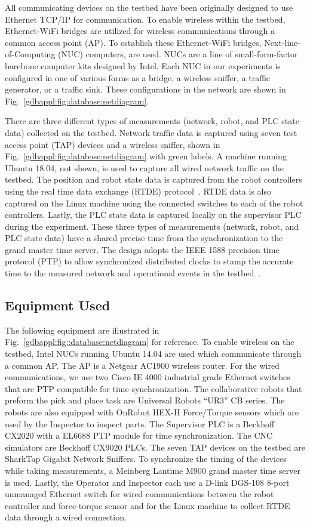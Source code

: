 All communicating devices on the testbed have been originally designed to use Ethernet TCP/IP for communication. To enable wireless within the testbed, Ethernet-WiFi bridges are utilized for wireless communications through a common access point (AP). To establish these Ethernet-WiFi bridges, Next-line-of-Computing (NUC) computers, are used.  NUCs are a line of small-form-factor barebone computer kits designed by Intel.   Each NUC in our experiments is configured in one of various forms as a bridge, a wireless sniffer, a traffic generator, or a traffic sink. These configurations in the network are shown in Fig.~\ref{gdbappl:fig:database:netdiagram}.

There are three different types of measurements (network, robot, and PLC state data) collected on the testbed. Network traffic data is captured using seven test access point (TAP) devices and a wireless sniffer, shown in Fig.~\ref{gdbappl:fig:database:netdiagram} with green labels. A machine running Ubuntu 18.04, not shown, is used to capture all wired network traffic on the testbed. The position and robot state data is captured from the robot controllers using the real time data exchange (RTDE) protocol~\cite{RTDE}. RTDE data is also captured on the Linux machine using the connected switches to each of the robot controllers. Lastly, the PLC state data is captured locally on the supervisor PLC during the experiment. These three types of measurements (network, robot, and PLC state data) have a shared precise time from the synchronization to the grand master time server. The design adopts the IEEE 1588 precision time protocol (PTP) to allow synchronized distributed clocks to stamp the accurate time to the measured network and operational events in the testbed~\cite{IEEE-Std-1588-2008-redline}.

\subsection{Equipment Used}

The following equipment are illustrated in Fig.~\ref{gdbappl:fig::database:netdiagram} for reference.
To enable wireless on the testbed, Intel NUCs running Ubuntu 14.04 are used which communicate through a common AP. The AP is a Netgear AC1900 wireless router. For the wired communications, we use two Cisco IE 4000 industrial grade Ethernet switches that are PTP compatible for time synchronization. The collaborative robots that preform the pick and place task are Universal Robots “UR3” CB series. The robots are also equipped with OnRobot HEX-H Force/Torque sensors which are used by the Inspector to inspect parts. The Supervisor PLC is a Beckhoff CX2020 with a EL6688 PTP module for time synchronization. The CNC simulators are Beckhoff CX9020 PLCs. The seven TAP devices on the testbed are SharkTap Gigabit Network Sniffers. To synchronize the timing of the devices while taking measurements, a Meinberg Lantime M900 grand master time server is used. Lastly, the Operator and Inspector each use a D-link DGS-108 8-port unmanaged Ethernet switch for wired communications between the robot controller and force-torque sensor and for the Linux machine to collect RTDE data through a wired connection.

